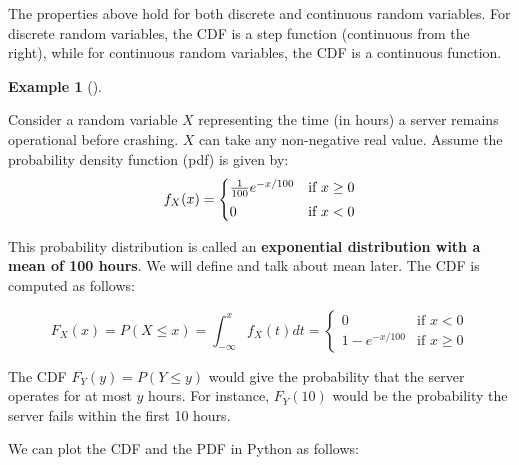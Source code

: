 \documentclass[
  letterpaper,
  DIV=11,
  numbers=noendperiod]{scrreport}
\theoremstyle{definition}
\newtheorem{example}{Example}[chapter]
\theoremstyle{plain}
\theoremstyle{definition}
\theoremstyle{plain}
\theoremstyle{remark}
\begin{document}
The properties above hold for both discrete and continuous random
variables. For discrete random variables, the CDF is a step function
(continuous from the right), while for continuous random variables, the
CDF is a continuous function.

\begin{tcolorbox}[enhanced jigsaw, breakable, opacityback=0, leftrule=.75mm, colback=white, bottomtitle=1mm, coltitle=black, toptitle=1mm, titlerule=0mm, bottomrule=.15mm, colframe=quarto-callout-note-color-frame, title={CDF of a continuous random variable}, opacitybacktitle=0.6, colbacktitle=quarto-callout-note-color!10!white, rightrule=.15mm, arc=.35mm, toprule=.15mm, left=2mm]

\begin{example}[]\protect\hypertarget{exm-cdf-continuous}{}\label{exm-cdf-continuous}

Consider a random variable \(X\) representing the time (in hours) a
server remains operational before crashing. \(X\) can take any
non-negative real value. Assume the probability density function (pdf)
is given by: \[
f_X(x)=
\begin{cases}
\frac{1}{100} e^{-x/100} & \text{if } x \ge 0 \\
\rule{0in}{3ex}0 & \text{if } x < 0
\end{cases}
\]

This probability distribution is called an \textbf{exponential
distribution with a mean of 100 hours}. We will define and talk about
mean later. The CDF is computed as follows:

\[
F_X(x) = P(X \le x) = \int_{-\infty}^x f_X(t) dt =
\begin{cases}
0 & \text{if } x < 0 \\
1 - e^{-x/100} & \text{if } x \ge 0
\end{cases}
\]

The CDF \(F_Y(y) = P(Y \le y)\) would give the probability that the
server operates for at most \(y\) hours. For instance, \(F_Y(10)\) would
be the probability the server fails within the first 10 hours.

\end{example}

\end{tcolorbox}

We can plot the CDF and the PDF in Python as follows:
\end{document}
